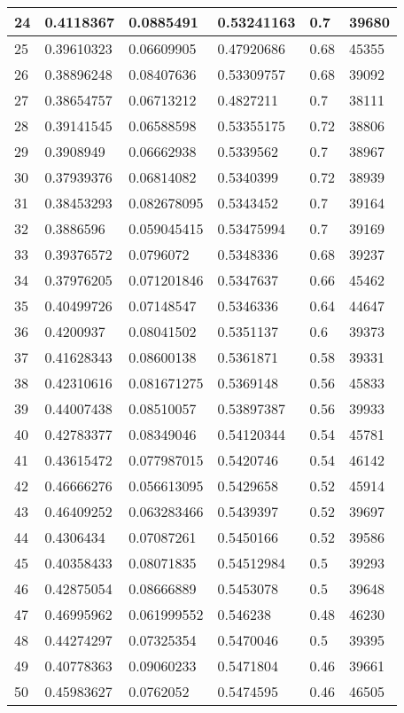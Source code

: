 \begin{longtable}{|l|l|l|l|l|l|}
24 & 0.4118367 & 0.0885491 & 0.53241163 & 0.7 & 39680 \\ \hline 
25 & 0.39610323 & 0.06609905 & 0.47920686 & 0.68 & 45355 \\ \hline 
26 & 0.38896248 & 0.08407636 & 0.53309757 & 0.68 & 39092 \\ \hline 
27 & 0.38654757 & 0.06713212 & 0.4827211 & 0.7 & 38111 \\ \hline 
28 & 0.39141545 & 0.06588598 & 0.53355175 & 0.72 & 38806 \\ \hline 
29 & 0.3908949 & 0.06662938 & 0.5339562 & 0.7 & 38967 \\ \hline 
30 & 0.37939376 & 0.06814082 & 0.5340399 & 0.72 & 38939 \\ \hline 
31 & 0.38453293 & 0.082678095 & 0.5343452 & 0.7 & 39164 \\ \hline 
32 & 0.3886596 & 0.059045415 & 0.53475994 & 0.7 & 39169 \\ \hline 
33 & 0.39376572 & 0.0796072 & 0.5348336 & 0.68 & 39237 \\ \hline 
34 & 0.37976205 & 0.071201846 & 0.5347637 & 0.66 & 45462 \\ \hline 
35 & 0.40499726 & 0.07148547 & 0.5346336 & 0.64 & 44647 \\ \hline 
36 & 0.4200937 & 0.08041502 & 0.5351137 & 0.6 & 39373 \\ \hline 
37 & 0.41628343 & 0.08600138 & 0.5361871 & 0.58 & 39331 \\ \hline 
38 & 0.42310616 & 0.081671275 & 0.5369148 & 0.56 & 45833 \\ \hline 
39 & 0.44007438 & 0.08510057 & 0.53897387 & 0.56 & 39933 \\ \hline 
40 & 0.42783377 & 0.08349046 & 0.54120344 & 0.54 & 45781 \\ \hline 
41 & 0.43615472 & 0.077987015 & 0.5420746 & 0.54 & 46142 \\ \hline 
42 & 0.46666276 & 0.056613095 & 0.5429658 & 0.52 & 45914 \\ \hline 
43 & 0.46409252 & 0.063283466 & 0.5439397 & 0.52 & 39697 \\ \hline 
44 & 0.4306434 & 0.07087261 & 0.5450166 & 0.52 & 39586 \\ \hline 
45 & 0.40358433 & 0.08071835 & 0.54512984 & 0.5 & 39293 \\ \hline 
46 & 0.42875054 & 0.08666889 & 0.5453078 & 0.5 & 39648 \\ \hline 
47 & 0.46995962 & 0.061999552 & 0.546238 & 0.48 & 46230 \\ \hline 
48 & 0.44274297 & 0.07325354 & 0.5470046 & 0.5 & 39395 \\ \hline 
49 & 0.40778363 & 0.09060233 & 0.5471804 & 0.46 & 39661 \\ \hline 
50 & 0.45983627 & 0.0762052 & 0.5474595 & 0.46 & 46505 \\ \hline 
\end{longtable}